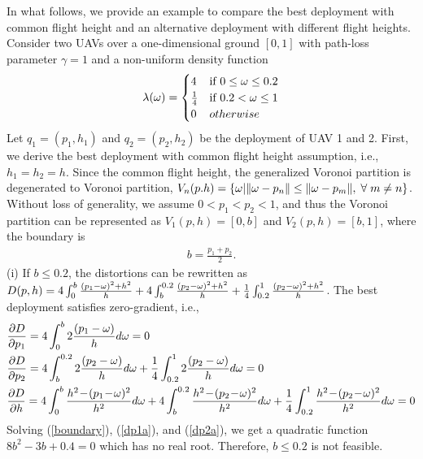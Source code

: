 \documentclass[12pt,onecolumn,journal,draftclsnofoot,letterpaper]{IEEEtran}
\newcounter{example}[section]
\begin{document}
In what follows, we provide an example to compare the best deployment with common flight height and an alternative
deployment with different flight heights.  Consider two UAVs over a one-dimensional ground $[0,1]$ with path-loss
parameter $\gamma=1$ and a non-uniform density function 
%
\begin{align}
    \lambda(\omega) = 
    \begin{cases}
        4 & \text{if } 0\le\omega\le0.2\\
        \frac{1}{4} & \text{if } 0.2<\omega\le1\\
        0 & otherwise
    \end{cases}
\end{align}
%
Let $q_1=\left(p_1, h_1\right)$ and $q_2=\left(p_2, h_2\right)$ be the deployment of UAV 1 and 2.  First, we derive the
best deployment with common flight height assumption, i.e., $h_1=h_2=h$.  Since the common flight height, the
generalized Voronoi partition is degenerated to Voronoi partition, $V_n(p. h)=\{\ome|\|\ome-p_n\|\le\|\ome-p_m\|,
\forall m\ne n\}$.  Without loss of generality, we assume $0<p_1<p_2<1$, and thus the Voronoi partition can be
represented as $V_1(p, h) = [0, b]$ and $V_2(p, h) = [b, 1]$, where the boundary is 
%
\begin{align}
  b = \frac{p_1+p_2}{2}.\label{boundary}
\end{align}
%
(i) If $b\le0.2$, the distortions can be rewritten as
$D(p,h)=4\int_{0}^{b}\frac{(p_1-\omega)^2+h^2}{h}+4\int_{b}^{0.2}\frac{(p_2-\omega)^2+h^2}{h} +
\frac{1}{4}\int_{0.2}^{1}\frac{(p_2-\omega)^2+h^2}{h}$.  The best deployment satisfies zero-gradient, i.e.,
%
\begin{align}
    &\frac{\partial D}{\partial p_1} = 4\int_{0}^{b}2\frac{(p_1-\ome)}{h}d\ome=0 \label{dp1a}\\
    &\frac{\partial D}{\partial p_2} = 4\int_{b}^{0.2}2\frac{(p_2-\ome)}{h}d\ome
    + \frac{1}{4}\int_{0.2}^{1}2\frac{(p_2-\ome)}{h}d\ome = 0\label{dp2a}\\
    &\frac{\partial D}{\partial h} = 4\int_{0}^{b}\frac{h^2\!-\!(p_1\!-\!\ome)^2}{h^2}d\ome 
    + 4\int_{b}^{0.2}\frac{h^2\!-\!(p_2\!-\!\ome)^2}{h^2}d\ome 
    + \frac{1}{4}\int_{0.2}^1\frac{h^2\!-\!(p_2\!-\!\ome)^2}{h^2}d\ome= 0\notag
\end{align}
Solving (\ref{boundary}), (\ref{dp1a}), and (\ref{dp2a}), we get a quadratic function $8b^2-3b+0.4=0$ which has no real root.
Therefore, $b\le0.2$ is not feasible.\\
\end{document}
